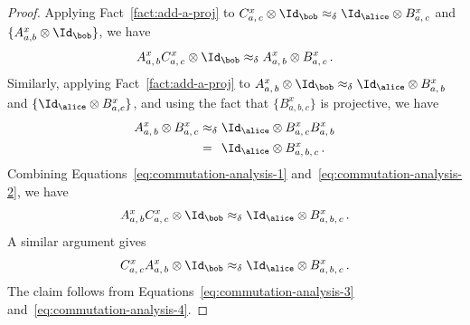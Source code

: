 \begin{proof}
  Applying Fact~\ref{fact:add-a-proj} to $C^x_{a,\, c} \otimes \Id_\bob
  \approx_\delta \Id_\alice \otimes B^x_{a,\, c}$ and $\{A^x_{a,b} \otimes
  \Id_\bob \}$, we have
  \begin{equation}
    \label{eq:commutation-analysis-1}
    A^x_{a,\, b} C^x_{a,\, c} \otimes \Id_\bob
    \approx_\delta A^x_{a,\, b} \otimes B^x_{a,\, c}\,.
  \end{equation}
  Similarly, applying Fact~\ref{fact:add-a-proj} to $A^x_{a,\, b} \otimes
  \Id_\bob \approx_\delta \Id_\alice \otimes B^x_{a,\, b}$ and $\{\Id_\alice
  \otimes B^x_{a,c}\}$, and using the fact that $\{B^x_{a,b,c}\}$ is projective,
  we have
  \begin{equation}
    \label{eq:commutation-analysis-2}
    \begin{split}
      A^x_{a,\, b} \otimes B^x_{a,\, c}
      & \approx_\delta \Id_\alice \otimes B^x_{a,\, c} B^x_{a,\, b}\\
      & =_{\phantom{\delta}} \Id_\alice \otimes B^x_{a,\, b,\, c}\,.
    \end{split}
  \end{equation}
  Combining Equations~\eqref{eq:commutation-analysis-1}
  and~\eqref{eq:commutation-analysis-2}, we have
  \begin{equation}
    \label{eq:commutation-analysis-3}
    A^x_{a,\, b} C^x_{a,\, c} \otimes \Id_\bob \approx_\delta
    \Id_\alice \otimes B^x_{a,\, b,\, c}\,.
  \end{equation}
  A similar argument gives
  \begin{equation}
    \label{eq:commutation-analysis-4}
    C^x_{a,\, c} A^x_{a,\, b} \otimes \Id_\bob \approx_\delta
    \Id_\alice \otimes B^x_{a,\, b,\, c}\,.
  \end{equation}
  The claim follows from Equations~\eqref{eq:commutation-analysis-3}
  and~\eqref{eq:commutation-analysis-4}.
\end{proof}



